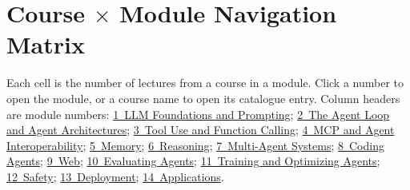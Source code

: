 \documentclass[10pt,oneside]{report}
\begin{document}
\chapter{Course $\times$ Module Navigation Matrix}\hypertarget{navmatrix}{}
Each cell is the number of lectures from a course in a module. Click a number to open the module, or a course name to open its catalogue entry. Column headers are module numbers:
\hyperlink{mod-FND}{1~LLM Foundations and Prompting}; \hyperlink{mod-ARCH}{2~The Agent Loop and Agent Architectures}; \hyperlink{mod-TOOL}{3~Tool Use and Function Calling}; \hyperlink{mod-MCP}{4~MCP and Agent Interoperability}; \hyperlink{mod-MEM}{5~Memory}; \hyperlink{mod-RSN}{6~Reasoning}; \hyperlink{mod-MULTI}{7~Multi-Agent Systems}; \hyperlink{mod-CODE}{8~Coding Agents}; \hyperlink{mod-WEB}{9~Web}; \hyperlink{mod-EVAL}{10~Evaluating Agents}; \hyperlink{mod-TRAIN}{11~Training and Optimizing Agents}; \hyperlink{mod-SAFE}{12~Safety}; \hyperlink{mod-DEPLOY}{13~Deployment}; \hyperlink{mod-APP}{14~Applications}.
\end{document}
